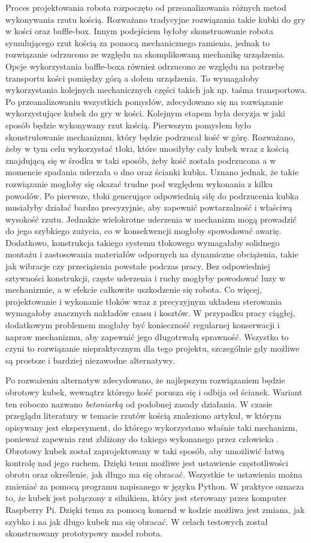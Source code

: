 Proces projektowania robota rozpoczęto od przeanalizowania różnych metod wykonywania rzutu kością. Rozważano tradycyjne rozwiązania takie kubki do gry w kości oraz baffle-box.
Innym podejściem byłoby skonstruowanie robota symulującego rzut kością za pomocą mechanicznego ramienia, jednak to rozwiązanie odrzucono ze względu na 
skomplikowaną mechanikę urządzenia. Opcje wykorzystania baffle-boxa również odrzucono ze względu na potrzebę transportu kości pomiędzy górą a dołem urządzenia. To wymagałoby
wykorzystania kolejnych mechanicznych części takich jak np. taśma transportowa.
Po przeanalizowaniu wszystkich pomysłów, zdecydowano się na rozwiązanie wykorzystujące kubek do gry w kości. Kolejnym etapem była decyzja w jaki sposób 
będzie wykonywany rzut kością. Pierwszym pomysłem było skonstrułowanie mechanizmu, który będzie podrzucał kość w górę. Rozważano, żeby w tym celu wykorzystać tłoki, które unosiłyby cały
kubek wraz z kością znajdującą się w środku w taki sposób, żeby kość została podrzucona a w momencie spadania uderzała o dno oraz ścianki kubka.
Uznano jednak, że takie rozwiązanie mogłoby się okazać trudne pod względem wykonania z kilku powodów. Po pierwsze, tłoki 
generujące odpowiednią siłę do podrzucenia kubka musiałyby działać bardzo precyzyjnie, aby zapewnić powtarzalność i właściwą wysokość rzutu. Jednakże 
wielokrotne uderzenia w mechanizm mogą prowadzić do jego szybkiego zużycia, co w konsekwencji mogłoby spowodować awarię.
Dodatkowo, konstrukcja takiego systemu tłokowego wymagałaby solidnego montażu i zastosowania materiałów odpornych na dynamiczne obciążenia, takie jak 
wibracje czy przeciążenia powstałe podczas pracy. Bez odpowiedniej sztywności konstrukcji, częste uderzenia i ruchy mogłyby powodować luzy w mechanizmie, 
a w efekcie całkowite uszkodzenie się robota.
Co więcej, projektowanie i wykonanie tłoków wraz z precyzyjnym układem sterowania wymagałoby znacznych nakładów czasu i kosztów. W przypadku pracy 
ciągłej, dodatkowym problemem mogłaby być konieczność regularnej konserwacji i napraw mechanizmu, aby zapewnić jego długotrwałą sprawność. Wszystko to 
czyni to rozwiązanie niepraktycznym dla tego projektu, szczególnie gdy możliwe są prostsze i bardziej niezawodne alternatywy. 

Po rozważeniu alternatyw
zdecydowano, że najlepszym rozwiązaniem będzie obrotowy kubek, wewnątrz którego kość porusza się i odbija od ścianek. Wariant ten roboczo nazwano \textit{betoniarką} od podobnej
zasady działania. W czasie przeglądu literatury w temacie rzutów kością znaleziono artykuł, w którym opisywany jest eksperyment, do którego wykorzystano właśnie taki 
mechanizm, ponieważ zapewnia rzut zbliżony do takiego wykonanego przez człowieka \cite{PK}. Obrotowy kubek został zaprojektowany w taki 
sposób, aby umożliwić łatwą kontrolę nad jego ruchem. Dzięki temu możliwe jest ustawienie częstotliwości obrotu oraz określenie, jak długo ma się obracać. Wszystkie te ustawienia 
można zmieniać za pomocą programu napisanego w języku Python. W praktyce oznacza to, że kubek jest połączony z silnikiem, który jest sterowany przez komputer 
Raspberry Pi. Dzięki temu za pomocą komend w kodzie możliwa jest zmiana, jak szybko i na jak długo kubek ma się obracać.
W celach testowych został skonstruowany prototypowy model robota.

